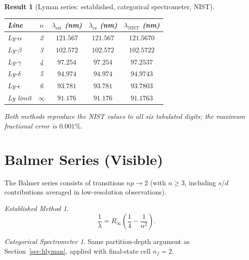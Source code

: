 \documentclass[11pt,a4paper]{article}
\theoremstyle{stmtstyle}
\newtheorem{result}{Result}
\theoremstyle{definition}
\theoremstyle{remark}
\newtheorem*{spectrometer}{Categorical Spectrometer}
\newtheorem*{established}{Established Method}
\begin{document}
\begin{result}[Lyman series: established, categorical spectrometer, NIST]
\label{res:lyman}
\begin{center}\small
\begin{tabular}{lcccc}
\toprule
Line & $n$ & $\lambda_{\mathrm{est}}$ (nm) & $\lambda_{\mathrm{cs}}$ (nm) & $\lambda_{\mathrm{NIST}}$ (nm)\\
\midrule
Ly-$\alpha$ & 2 & $121.567$ & $121.567$ & $121.5670$\\
Ly-$\beta$  & 3 & $102.572$ & $102.572$ & $102.5722$\\
Ly-$\gamma$ & 4 & $97.254$  & $97.254$  & $97.2537$\\
Ly-$\delta$ & 5 & $94.974$  & $94.974$  & $94.9743$\\
Ly-$\epsilon$ & 6 & $93.781$ & $93.781$ & $93.7803$\\
Ly limit & $\infty$ & $91.176$ & $91.176$ & $91.1763$\\
\bottomrule
\end{tabular}
\end{center}
Both methods reproduce the NIST values to all six tabulated digits; the maximum fractional error is $0.001\%$.
\end{result}

\section{Balmer Series (Visible)}
\label{sec:hbalmer}

The Balmer series consists of transitions $np \to 2$ (with $n \geq 3$, including $s$/$d$ contributions averaged in low-resolution observations).

\begin{established}
\begin{equation}
\frac{1}{\lambda} = R_{\infty}\left(\frac{1}{4} - \frac{1}{n^{2}}\right).
\label{eq:balmerrydberg}
\end{equation}
\end{established}

\begin{spectrometer}
Same partition-depth argument as Section~\ref{sec:hlyman}, applied with final-state cell $n_{f}=2$.
\end{spectrometer}
\end{document}
